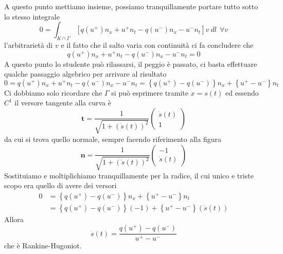 \documentclass[10pt,a4paper,twoside,openright]{book}
\begin{document}
\begin{dimostrazione}
	A questo punto mettiamo insieme, possiamo tranquillamente portare tutto sotto lo stesso integrale
	\begin{equation*}
		0=\int _{K\cap \Gamma }\left[ q\left( u^{+}\right) n_{x} +u^{+} n_{t} -q\left( u^{-}\right) n_{x} -u^{-} n_{t}\right] v\ dl\ \ \forall v
	\end{equation*}
	l'arbitrarietà di $v$ e il fatto che il salto varia con continuità ci fa concludere che
	\begin{equation*}
		q\left( u^{+}\right) n_{x} +u^{+} n_{t} -q\left( u^{-}\right) n_{x} -u^{-} n_{t} =0
	\end{equation*}
	A questo punto lo studente può rilassarsi, il peggio è passato, ci basta effettuare qualche passaggio algebrico per arrivare al risultato
	\begin{equation*}
		0=q\left( u^{+}\right) n_{x} +u^{+} n_{t} -q\left( u^{-}\right) n_{x} -u^{-} n_{t} =\left\{q\left( u^{+}\right) -q\left( u^{-}\right)\right\} n_{x} +\left\{u^{+} -u^{-}\right\} n_{t}
	\end{equation*}
	Ci dobbiamo solo ricordare che $\Gamma $ si può esprimere tramite $x=s( t)$ ed essendo $C^{1}$ il versore tangente alla curva è
	\begin{equation*}
		\mathbf{t} =\frac{1}{\sqrt{1+(\dot{s}( t))^{2}}}
		\begin{pmatrix}
			\dot{s}( t) \\
			1           
		\end{pmatrix}
	\end{equation*}
	da cui si trova quello normale, sempre facendo riferimento alla figura
	\begin{equation*}
		\mathbf{n} =\frac{1}{\sqrt{1+(\dot{s}( t))^{2}}}
		\begin{pmatrix}
			-1          \\
			\dot{s}( t) 
		\end{pmatrix}
	\end{equation*}
	Sostituiamo e moltiplichiamo tranquillamente per la radice, il cui unico e triste scopo era quello di avere dei versori
	\begin{align*}
		0 & =\left\{q\left( u^{+}\right) -q\left( u^{-}\right)\right\} n_{x} +\left\{u^{+} -u^{-}\right\} n_{t}       \\
		  & =\left\{q\left( u^{+}\right) -q\left( u^{-}\right)\right\}( -1) +\left\{u^{+} -u^{-}\right\}(\dot{s}( t)) 
	\end{align*}
	Allora
	\begin{equation*}
		\dot{s}( t) =\frac{q\left( u^{+}\right) -q\left( u^{-}\right)}{u^{+} -u^{-}}
	\end{equation*}
	che è Rankine-Hugoniot.
\end{dimostrazione}
\end{document}
